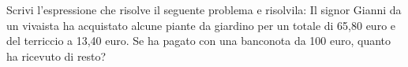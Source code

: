 \item Scrivi l'espressione che risolve il seguente problema e risolvila: Il signor Gianni da un vivaista ha acquistato alcune piante da giardino per un totale di 65,80 euro e del terriccio a 13,40 euro. Se ha pagato con una banconota da 100 euro, quanto ha ricevuto di resto?